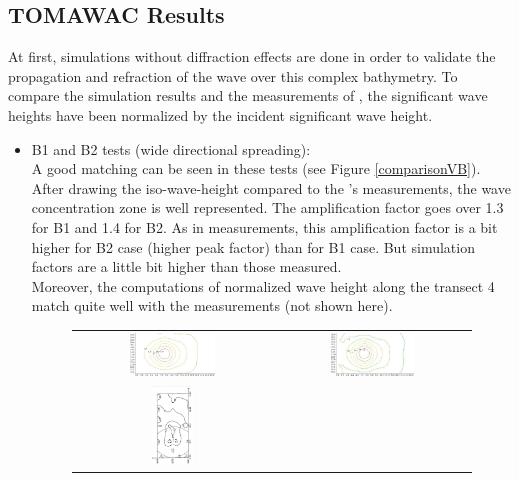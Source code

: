 \subsection{TOMAWAC Results }
At first, simulations without diffraction effects are done in order to validate the propagation and refraction of the wave over this complex bathymetry. To compare the simulation results and the measurements of \cite{Vincent1989}, the significant wave heights have been normalized by the incident significant wave height.\\
\begin{itemize}
\item B1 and B2 tests (wide directional spreading):\\
A good matching can be seen in these tests (see Figure \ref{comparisonVB}). After drawing the iso-wave-height compared to the \cite{Vincent1989}'s measurements, the wave concentration zone is well represented. The amplification factor goes over 1.3 for B1 and 1.4 for B2. As in measurements, this amplification factor is a bit higher for B2 case (higher peak factor) than for B1 case. But simulation factors are a little bit higher than those measured.\\
Moreover, the computations of normalized wave height along the transect 4 match quite well with the measurements (not shown here).\\
\begin{figure}[H]
  \centering
  \begin{tabular}{cc}
  	\includegraphics[width=0.45\textwidth]{iso-B1.jpg}&\includegraphics[width=0.45\textwidth]{iso-B2.jpg}\\
  	\includegraphics[width=0.22\textwidth,angle=-90]{B1_m.JPG}

\end{tabular}
\end{figure}
\end{itemize}
